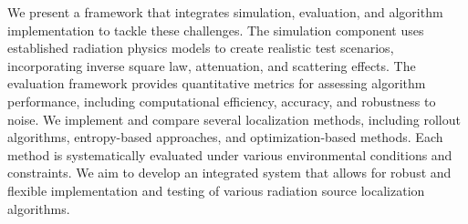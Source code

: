 \documentclass[../report.tex]{subfiles}
\begin{document}
    We present a framework that integrates simulation, evaluation, and algorithm implementation to tackle these challenges. The simulation component uses established radiation physics models 
    to create realistic test scenarios, incorporating inverse square law, attenuation, and scattering effects. The evaluation framework provides quantitative metrics for assessing algorithm 
    performance, including computational efficiency, accuracy, and robustness to noise. We implement and compare several localization methods, including rollout algorithms, entropy-based 
    approaches, and optimization-based methods. Each method is systematically evaluated under various environmental conditions and constraints. We aim to develop an integrated system that 
    allows for robust and flexible implementation and testing of various radiation source localization algorithms.
\end{document}
